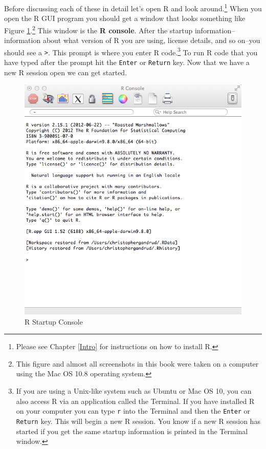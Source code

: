 Before discussing each of these in detail let's open R and look around.\footnote{Please see Chapter \ref{Intro} for instructions on how to install R.} When you open the R GUI program you should get a window that looks something like Figure \ref{RBlankMain}.\footnote{This figure and almost all screenshots in this book were taken on a computer using the Mac OS 10.8 operating system.} This window is the {\bf{R console}}. After the startup information--information about what version of R you are using, license details, and so on--you should see a {\tt{\textgreater}}. This prompt is where you enter R code.\footnote{If you are using a Unix-like system such as Ubuntu or Mac OS 10, you can also access R via an application called the Terminal. If you have installed R on your computer you can type {\tt{r}} into the Terminal and then the {\tt{Enter}} or {\tt{Return}} key. This will begin a new R session. You know if a new R session has started if you get the same startup information is printed in the Terminal window.} To run R code that you have typed after the prompt hit the {\tt{Enter}} or {\tt{Return}} key. Now that we have a new R session open we can get started. 

\begin{figure}[th!]
    \caption{R Startup Console}
    \label{RBlankMain}
    \begin{center}
    \includegraphics[scale=0.4]{Children/Chapter3/images3/BlankRConsole.png}
    \end{center}
\end{figure}

